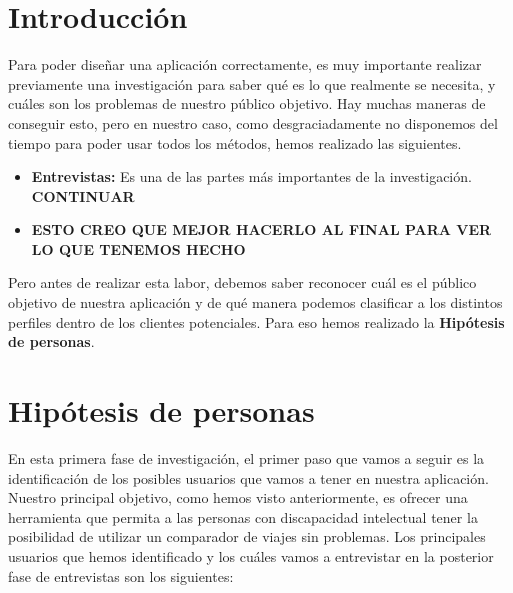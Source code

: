 
\section{Introducción}

Para poder diseñar una aplicación correctamente, es muy importante realizar previamente una investigación para saber qué
es lo que realmente se necesita, y cuáles son los problemas de nuestro público objetivo. Hay muchas maneras de conseguir esto, pero en nuestro
caso, como desgraciadamente no disponemos del tiempo para poder usar todos los métodos, hemos realizado las siguientes.

\begin{itemize}
    \item \textbf{Entrevistas:} Es una de las partes más importantes de la investigación. \textbf{CONTINUAR}
    \item \textbf{ESTO CREO QUE MEJOR HACERLO AL FINAL PARA VER LO QUE TENEMOS HECHO}
\end{itemize}



Pero antes de realizar esta labor, debemos saber reconocer cuál es el público objetivo de nuestra aplicación y
de qué manera podemos clasificar a los distintos perfiles dentro de los clientes potenciales. Para eso hemos realizado la
\textbf{Hipótesis de personas}.

\section{Hipótesis de personas}

En esta primera fase de investigación, el primer paso que vamos a seguir es la identificación de los posibles usuarios que vamos a tener
en nuestra aplicación. Nuestro principal objetivo, como hemos visto anteriormente, es ofrecer una herramienta que permita a las personas con
discapacidad intelectual tener la posibilidad de utilizar un comparador de viajes sin problemas. Los principales usuarios que hemos identificado
y los cuáles vamos a entrevistar en la posterior fase de entrevistas son los siguientes:

